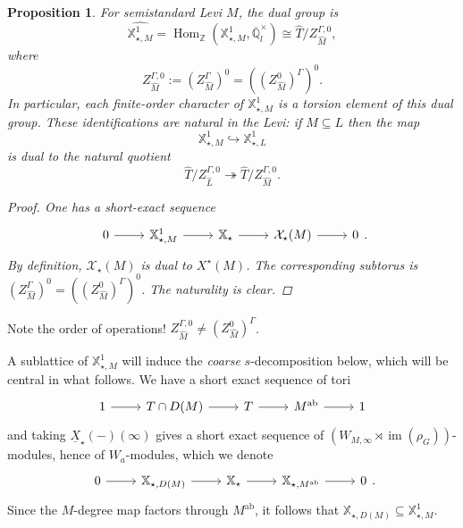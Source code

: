 \documentclass[openany]{amsbook}
\newtheorem{proposition}[theorem]{Proposition}
\theoremstyle{definition}
\theoremstyle{remark}
\numberwithin{equation}{section}
\newcommand{\Q}{\mathbb{Q}}
\newcommand{\Z}{\mathbb{Z}}
\newcommand{\cX}{\mathcal{X}}
\newcommand{\im}{\operatorname{im}}
\newcommand{\ol}[1]{\overline{#1}}
\newcommand{\ul}[1]{\underline{#1}}
\renewcommand{\-}{\operatorname{-}}
\newcommand{\Hom}{\operatorname{Hom}}
\newcommand{\bX}{\mathbb{X}}
\newcommand{\ab}{\mathrm{ab}}
\begin{document}
\begin{proposition}\label{prop.dual.levi.chars.fine}
    For semistandard Levi $M$, the dual group is
    $$
        \widehat{\bX_{\star,M}^1} = \Hom_{\Z}(\bX_{\star,M}^1, \ol{\Q}_l^\times) \cong \widehat{T}/Z_{\widehat{M}}^{\Gamma,0},
    $$
    where
    $$
        Z_{\widehat{M}}^{\Gamma, 0} := (Z_{\widehat{M}}^{\Gamma})^0 = ((Z_{\widehat{M}}^0)^{\Gamma})^0.
    $$
    In particular, each finite-order character of $\bX_{\star,M}^1$ is a torsion element of this dual group. These identifications are natural in the Levi: if $M \subseteq L$ then the map
    $$
        \bX_{\star,M}^1 \hookrightarrow \bX_{\star,L}^1
    $$
    is dual to the natural quotient
    $$\widehat{T}/Z_{\widehat{L}}^{\Gamma,0} \twoheadrightarrow \widehat{T}/Z_{\widehat{M}}^{\Gamma,0}.$$
    \begin{proof}
        One has a short-exact sequence
        $$
            \begin{tikzcd}[ampersand replacement=\&]
                0 \ar[r] \& \bX_{\star,M}^1 \ar[r] \& \bX_{\star} \ar[r] \& \cX_\star(M) \ar[r] \& 0
            \end{tikzcd}.
        $$
        By definition, $\cX_\star(M)$ is dual to $X^\star(M)$. The corresponding subtorus is $(Z_{\widehat{M}}^\Gamma)^0 =((Z_{\widehat{M}}^0)^{\Gamma})^0$. The naturality is clear.
    \end{proof}
\end{proposition}
Note the order of operations! $Z_{\widehat{M}}^{\Gamma, 0} \neq (Z_{\widehat{M}}^0)^\Gamma$.


A sublattice of $\bX_{\star,M}^1$ will induce the \emph{coarse} $s$-decomposition below, which will be central in what follows. We have a short exact sequence of tori
$$
\begin{tikzcd}[ampersand replacement=\&]
    1 \ar[r] \& T \cap D(M) \ar[r] \& T \ar[r] \& M^{\ab} \ar[r] \& 1
\end{tikzcd}
$$
and taking $\ul{X}_\star(-)(\infty)$ gives a short exact sequence of $(W_{M,\infty} \rtimes \im(\rho_G))$-modules, hence of $W_a$-modules, which we denote
\begin{equation}\label{eqn.def.XDM.lattices}
    \begin{tikzcd}[ampersand replacement=\&]
    0 \ar[r] \& \bX_{\star,D(M)} \ar[r] \& \bX_\star \ar[r] \& \bX_{\star,M^{\ab}} \ar[r] \& 0
\end{tikzcd}.
\end{equation}
Since the $M$-degree map factors through $M^{\ab}$, it follows that $\bX_{\star, D(M)} \subseteq \bX_{\star,M}^1$.
\end{document}
